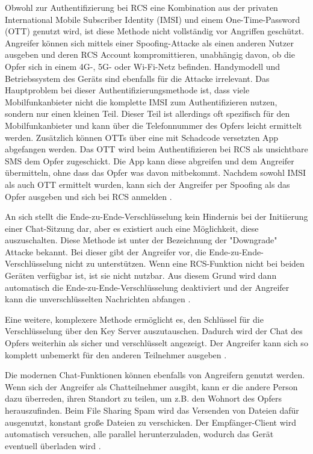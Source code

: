 \documentclass[conference]{IEEEtran}
\begin{document}
Obwohl zur Authentifizierung bei RCS eine Kombination aus der privaten International Mobile Subscriber Identity (IMSI) und einem One-Time-Password (OTT) genutzt wird, ist diese Methode nicht vollständig vor Angriffen geschützt.
Angreifer können sich mittels einer Spoofing-Attacke als einen anderen Nutzer ausgeben und deren RCS Account kompromittieren, unabhängig davon, ob die Opfer sich in einem 4G-, 5G- oder Wi-Fi-Netz befinden.
Handymodell und Betriebssystem des Geräts sind ebenfalls für die Attacke irrelevant.
Das Hauptproblem bei dieser Authentifizierungsmethode ist, dass viele Mobilfunkanbieter nicht die komplette IMSI zum Authentifizieren nutzen, sondern nur einen kleinen Teil.
Dieser Teil ist allerdings oft spezifisch für den Mobilfunkanbieter und kann über die Telefonnummer des Opfers leicht ermittelt werden.
Zusätzlich können OTTs über eine mit Schadcode versetzten App abgefangen werden.
Das OTT wird beim Authentifizieren bei RCS als unsichtbare SMS dem Opfer zugeschickt.
Die App kann diese abgreifen und dem Angreifer übermitteln, ohne dass das Opfer was davon mitbekommt.
Nachdem sowohl IMSI als auch OTT ermittelt wurden, kann sich der Angreifer per Spoofing als das Opfer ausgeben und sich bei RCS anmelden \cite{5gmsg}.

An sich stellt die Ende-zu-Ende-Verschlüsselung kein Hindernis bei der Initiierung einer Chat-Sitzung dar, aber es existiert auch eine Möglichkeit, diese auszuschalten.
Diese Methode ist unter der Bezeichnung der "Downgrade" Attacke bekannt.
Bei dieser gibt der Angreifer vor, die Ende-zu-Ende-Verschlüsselung nicht zu unterstützen.
Wenn eine RCS-Funktion nicht bei beiden Geräten verfügbar ist, ist sie nicht nutzbar.
Aus diesem Grund wird dann automatisch die Ende-zu-Ende-Verschlüsselung deaktiviert und der Angreifer kann die unverschlüsselten Nachrichten abfangen \cite{5gmsg}.

Eine weitere, komplexere Methode ermöglicht es, den Schlüssel für die Verschlüsselung über den Key Server auszutauschen.
Dadurch wird der Chat des Opfers weiterhin als sicher und verschlüsselt angezeigt.
Der Angreifer kann sich so komplett unbemerkt für den anderen Teilnehmer ausgeben \cite{5gmsg}.

Die modernen Chat-Funktionen können ebenfalls von Angreifern genutzt werden.
Wenn sich der Angreifer als Chatteilnehmer ausgibt, kann er die andere Person dazu überreden, ihren Standort zu teilen, um z.B. den Wohnort des Opfers herauszufinden.
Beim File Sharing Spam wird das Versenden von Dateien dafür ausgenutzt, konstant große Dateien zu verschicken.
Der Empfänger-Client wird automatisch versuchen, alle parallel herunterzuladen, wodurch das Gerät eventuell überladen wird \cite{5gmsg}.
\end{document}
